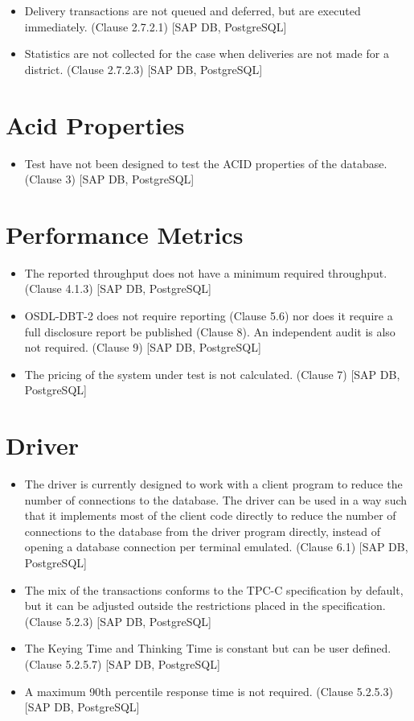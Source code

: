 \documentclass{article}
\begin{document}
\begin{itemize}
\item Delivery transactions are not queued and deferred, but are executed
      immediately.  (Clause 2.7.2.1) [SAP DB, PostgreSQL]

\item Statistics are not collected for the case when deliveries are not made
      for a district.  (Clause 2.7.2.3) [SAP DB, PostgreSQL]
\end{itemize}

\section{Acid Properties}

\begin{itemize}
\item Test have not been designed to test the ACID properties of the database.
      (Clause 3) [SAP DB, PostgreSQL]
\end{itemize}

\section{Performance Metrics}

\begin{itemize}
\item The reported throughput does not have a minimum required throughput.
      (Clause 4.1.3) [SAP DB, PostgreSQL]
\item OSDL-DBT-2 does not require reporting (Clause 5.6) nor does it require
      a full disclosure report be published (Clause 8).  An independent audit
      is also not required.  (Clause 9) [SAP DB, PostgreSQL]
\item The pricing of the system under test is not calculated.  (Clause 7)
      [SAP DB, PostgreSQL]
\end{itemize}

\section{Driver}

\begin{itemize}
\item The driver is currently designed to work with a client program to
      reduce the number of connections to the database.  The driver can be
      used in a way such that it implements most of the client code directly
      to reduce the number of connections to the database from the driver
      program directly, instead of opening a database connection per terminal
      emulated.  (Clause 6.1) [SAP DB, PostgreSQL]
\item The mix of the transactions conforms to the TPC-C specification by
      default, but it can be adjusted outside the restrictions placed in the
      specification.  (Clause 5.2.3) [SAP DB, PostgreSQL]
\item The Keying Time and Thinking Time is constant but can be user defined.
      (Clause 5.2.5.7) [SAP DB, PostgreSQL]
\item A maximum 90th percentile response time is not required.
      (Clause 5.2.5.3) [SAP DB, PostgreSQL]
\end{itemize}
\end{document}
